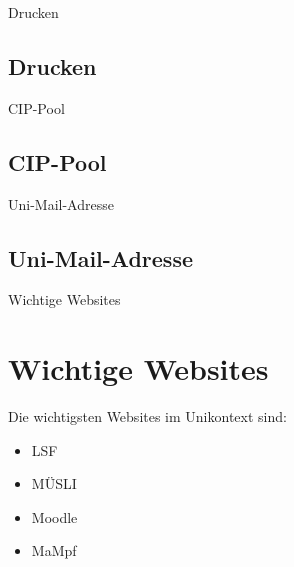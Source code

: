
\begin{frame}{Drucken}
  \subsection{Drucken}
\end{frame}


\begin{frame}{CIP-Pool}
  \subsection{CIP-Pool}
\end{frame}


\begin{frame}{Uni-Mail-Adresse}
  \subsection{Uni-Mail-Adresse}
\end{frame}


\begin{frame}{Wichtige Websites}
  \section{Wichtige Websites}
  Die wichtigsten Websites im Unikontext sind:
    \begin{itemize}
      \item{LSF}
      \item{MÜSLI}
      \item{Moodle}
      \item{MaMpf}
    \end{itemize}
\end{frame}


